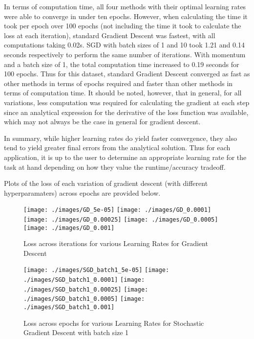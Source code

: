 In terms of computation time, all four methods with their optimal learning rates were able to converge in under ten epochs. However, when calculating the time it took per epoch over 100 epochs (not including the time it took to calculate the loss at each iteration), standard Gradient Descent was fastest, with all computations taking 0.02s. SGD with batch sizes of 1 and 10 took 1.21 and 0.14 seconds respectively to perform the same number of iterations. With momentum and a batch size of 1, the total computation time increased to 0.19 seconds for 100 epochs. Thus for this dataset, standard Gradient Descent converged as fast as other methods in terms of epochs required and faster than other methods in terms of computation time. It should be noted, however, that in general, for all variations, less computation was required for calculating the gradient at each step since an analytical expression for the derivative of the loss function was available, which may not always be the case in general for gradient descent.

In summary, while higher learning rates do yield faster convergence, they also tend to yield greater final errors from the analytical solution. Thus for each application, it is up to the user to determine an appropriate learning rate for the task at hand depending on how they value the runtime/accuracy tradeoff.

Plots of the loss of each variation of gradient descent (with different hyperparamaters) across epochs are provided below.

\begin{figure}
\centering
\texttt{[image: ./images/GD\_5e-05]}
\texttt{[image: ./images/GD\_0.0001]}
\texttt{[image: ./images/GD\_0.00025]}
\texttt{[image: ./images/GD\_0.0005]}
\texttt{[image: ./images/GD\_0.001]}
\caption{Loss across iterations for various Learning Rates for Gradient Descent}
\end{figure}

\begin{figure}
\centering
\texttt{[image: ./images/SGD\_batch1\_5e-05]}
\texttt{[image: ./images/SGD\_batch1\_0.0001]}
\texttt{[image: ./images/SGD\_batch1\_0.00025]}
\texttt{[image: ./images/SGD\_batch1\_0.0005]}
\texttt{[image: ./images/SGD\_batch1\_0.001]}
\caption{Loss across epochs for various Learning Rates for Stochastic Gradient Descent with batch size 1}
\end{figure}

